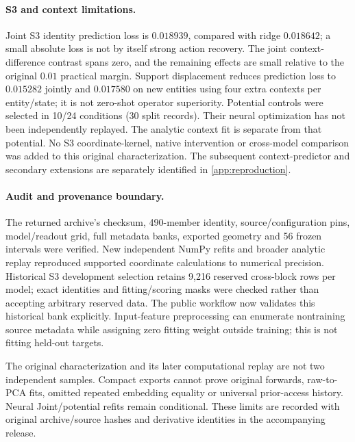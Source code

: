 \paragraph{S3 and context limitations.}
Joint S3 identity prediction loss is $0.018939$, compared with ridge $0.018642$; a small absolute loss is not by itself strong action recovery. The joint context-difference contrast spans zero, and the remaining effects are small relative to the original $0.01$ practical margin. Support displacement reduces prediction loss to $0.015282$ jointly and $0.017580$ on new entities using four extra contexts per entity/state; it is not zero-shot operator superiority. Potential controls were selected in 10/24 conditions (30 split records). Their neural optimization has not been independently replayed. The analytic context fit is separate from that potential. No S3 coordinate-kernel, native intervention or cross-model comparison was added to this original characterization. The subsequent context-predictor and secondary extensions are separately identified in \cref{app:reproduction}.

\paragraph{Audit and provenance boundary.}
The returned archive's checksum, 490-member identity, source/configuration pins, model/readout grid, full metadata banks, exported geometry and 56 frozen intervals were verified. New independent NumPy refits and broader analytic replay reproduced supported coordinate calculations to numerical precision. Historical S3 development selection retains 9,216 reserved cross-block rows per model; exact identities and fitting/scoring masks were checked rather than accepting arbitrary reserved data. The public workflow now validates this historical bank explicitly. Input-feature preprocessing can enumerate nontraining source metadata while assigning zero fitting weight outside training; this is not fitting held-out targets.

The original characterization and its later computational replay are not two independent samples. Compact exports cannot prove original forwards, raw-to-PCA fits, omitted repeated embedding equality or universal prior-access history. Neural Joint/potential refits remain conditional. These limits are recorded with original archive/source hashes and derivative identities in the accompanying release.

